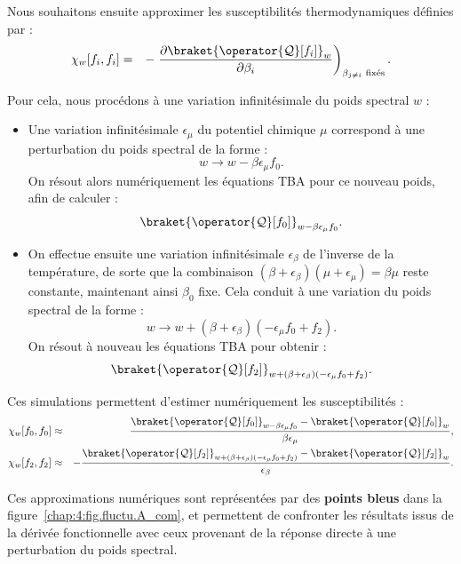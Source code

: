 \medskip

Nous souhaitons ensuite approximer les susceptibilités thermodynamiques définies par :
\begin{eqnarray}
	\chi_w[f_i, f_i] & = & - \left. \frac{\partial \braket{\operator{\mathcal{Q}}[f_i]}_w}{\partial \beta_i} \right)_{\beta_{j \neq i} \text{ fixés}}.
\end{eqnarray}

Pour cela, nous procédons à une variation infinitésimale du poids spectral $w$ :

\begin{itemize}[label =$\bullet$]
	\item Une variation infinitésimale $\epsilon_\mu$ du potentiel chimique $\mu$ correspond à une perturbation du poids spectral de la forme :  
	\[
	w \rightarrow w - \beta \epsilon_\mu f_0.
	\]
	On résout alors numériquement les équations TBA pour ce nouveau poids, afin de calculer :
	\[
	\braket{\operator{\mathcal{Q}}[f_0]}_{w - \beta \epsilon_\mu f_0}.
	\]

	\item On effectue ensuite une variation infinitésimale $\epsilon_\beta$ de l’inverse de la température, de sorte que la combinaison \( (\beta + \epsilon_\beta)(\mu + \epsilon_\mu) = \beta \mu \) reste constante, maintenant ainsi $\beta_0$ fixe. Cela conduit à une variation du poids spectral de la forme :
	\[
	w \rightarrow w + (\beta + \epsilon_\beta)(- \epsilon_\mu f_0 + f_2).
	\]
	On résout à nouveau les équations TBA pour obtenir :
	\[
	\braket{\operator{\mathcal{Q}}[f_2]}_{w + (\beta + \epsilon_\beta)(- \epsilon_\mu f_0 + f_2)}.
	\]
\end{itemize}

\medskip

Ces simulations permettent d’estimer numériquement les susceptibilités :
\begin{eqnarray}
	\chi_w[f_0, f_0]	 & \approx & \frac{\braket{\operator{\mathcal{Q}}[f_0]}_{w - \beta \epsilon_\mu f_0} - \braket{\operator{\mathcal{Q}}[f_0]}_w}{\beta \epsilon_\mu},	\\
	\chi_w[f_2, f_2]	 & \approx & - \frac{\braket{\operator{\mathcal{Q}}[f_2]}_{w + (\beta + \epsilon_\beta)(- \epsilon_\mu f_0 + f_2)} - \braket{\operator{\mathcal{Q}}[f_2]}_w}{\epsilon_\beta}.
\end{eqnarray}

\medskip

Ces approximations numériques sont représentées par des {\bf points bleus} dans la figure~\ref{chap:4:fig.fluctu.A_com}, et permettent de confronter les résultats issus de la dérivée fonctionnelle avec ceux provenant de la réponse directe à une perturbation du poids spectral.



